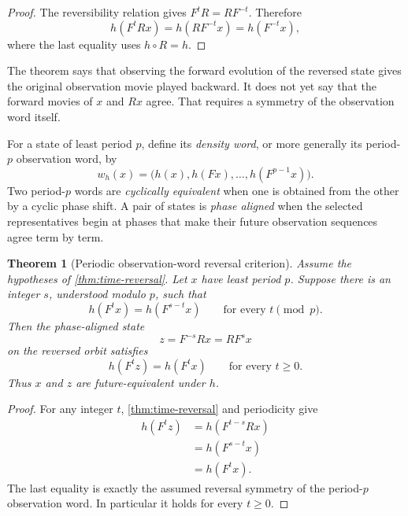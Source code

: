 \documentclass[11pt]{article}
\newtheorem{theorem}{Theorem}
\begin{document}
\begin{proof}
The reversibility relation gives $F^tR=RF^{-t}$. Therefore
\[
h(F^tRx)=h(RF^{-t}x)=h(F^{-t}x),
\]
where the last equality uses $h\circ R=h$.
\end{proof}

The theorem says that observing the forward evolution of the reversed state gives
the original observation movie played backward. It does not yet say that the
forward movies of $x$ and $Rx$ agree. That requires a symmetry of the observation
word itself.

For a state of least period $p$, define its \emph{density word}, or more generally
its period-$p$ observation word, by
\[
w_h(x)=\bigl(h(x),h(Fx),\ldots,h(F^{p-1}x)\bigr).
\]
Two period-$p$ words are \emph{cyclically equivalent} when one is obtained from
the other by a cyclic phase shift. A pair of states is \emph{phase aligned} when
the selected representatives begin at phases that make their future observation
sequences agree term by term.

\begin{theorem}[Periodic observation-word reversal criterion]
\label{thm:periodic-reversal}
Assume the hypotheses of \cref{thm:time-reversal}. Let $x$ have least period
$p$. Suppose there is an integer $s$, understood modulo $p$, such that
\[
h(F^t x)=h(F^{s-t}x)
\qquad\text{for every }t\pmod p.
\]
Then the phase-aligned state
\[
z=F^{-s}Rx=RF^s x
\]
on the reversed orbit satisfies
\[
h(F^t z)=h(F^t x)
\qquad\text{for every }t\geq0.
\]
Thus $x$ and $z$ are future-equivalent under $h$.
\end{theorem}

\begin{proof}
For any integer $t$, \cref{thm:time-reversal} and periodicity give
\[
\begin{aligned}
h(F^t z)
 &=h(F^{t-s}Rx)\\
 &=h(F^{s-t}x)\\
 &=h(F^t x).
\end{aligned}
\]
The last equality is exactly the assumed reversal symmetry of the period-$p$
observation word. In particular it holds for every $t\geq0$.
\end{proof}
\end{document}
